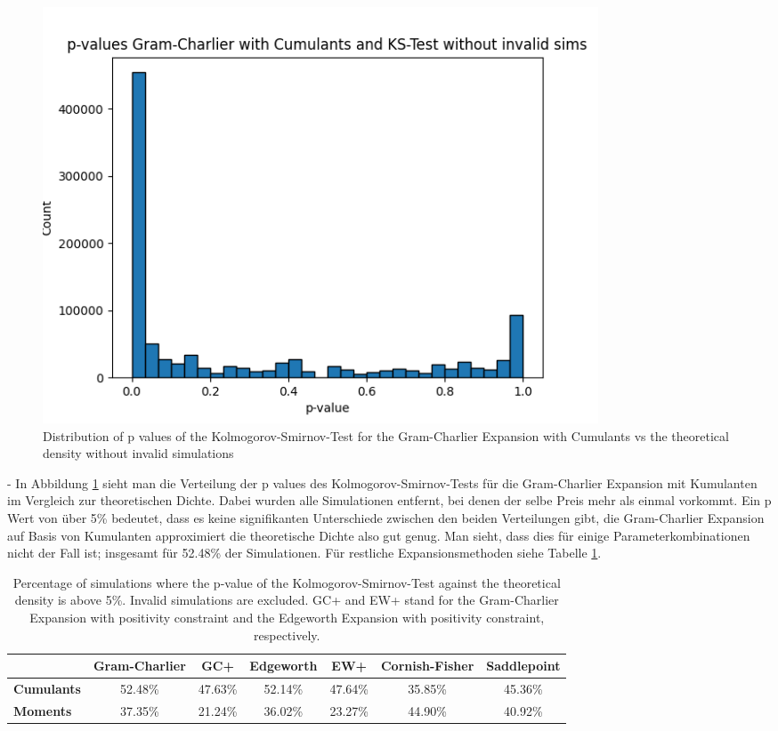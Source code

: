 \begin{figure}
    \centering
    \includegraphics[width=0.8\textwidth]{img/GC_cum_KS_p_value_histogram.png}
    \caption{Distribution of p values of the Kolmogorov-Smirnov-Test for the Gram-Charlier Expansion with Cumulants vs the theoretical density without invalid simulations}
    \label{fig:GC_cum_KS_p_value_histogram}
\end{figure}

- In Abbildung \ref{fig:GC_cum_KS_p_value_histogram} sieht man die Verteilung der p values des Kolmogorov-Smirnov-Tests für die Gram-Charlier Expansion mit Kumulanten im Vergleich zur theoretischen Dichte. Dabei wurden alle Simulationen entfernt, bei denen der selbe Preis mehr als einmal vorkommt. Ein p Wert von über 5\% bedeutet, dass es keine signifikanten Unterschiede zwischen den beiden Verteilungen gibt, die Gram-Charlier Expansion auf Basis von Kumulanten approximiert die theoretische Dichte also gut genug. Man sieht, dass dies für einige Parameterkombinationen nicht der Fall ist; insgesamt für 52.48\% der Simulationen. Für restliche Expansionsmethoden siehe Tabelle \ref{tab:KS_p_value_percentage}.

\begin{table}[h]
    \centering
    \begin{tabular}{l|c|c|c|c|c|c}
        & \textbf{Gram-Charlier} & \textbf{GC+} & \textbf{Edgeworth} & \textbf{EW+} & \textbf{Cornish-Fisher} & \textbf{Saddlepoint} \\
        \hline
        \textbf{Cumulants} & 52.48\% & 47.63\% & 52.14\% & 47.64\% & 35.85\% & 45.36\% \\
        \textbf{Moments} & 37.35\% & 21.24\% & 36.02\% & 23.27\% & 44.90\% & 40.92\%
    \end{tabular}
    \caption{Percentage of simulations where the p-value of the Kolmogorov-Smirnov-Test against the theoretical density is above 5\%. Invalid simulations are excluded. GC+ and EW+ stand for the Gram-Charlier Expansion with positivity constraint and the Edgeworth Expansion with positivity constraint, respectively.}
    \label{tab:KS_p_value_percentage}
\end{table}

